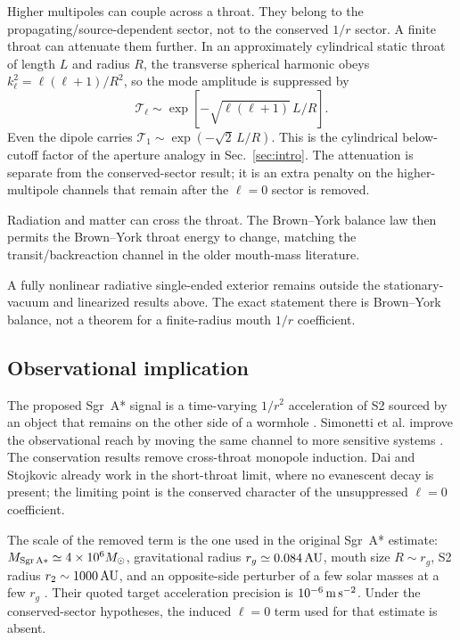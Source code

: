 \documentclass[aps,prd,10pt,onecolumn,nofootinbib,superscriptaddress,floatfix]{revtex4-2}
\begin{document}
Higher multipoles can couple across a throat.  They belong to the
propagating/source-dependent sector, not to the conserved $1/r$ sector.  A
finite throat can attenuate them further.  In an approximately cylindrical
static throat of length $L$ and radius $R$, the transverse spherical harmonic obeys
$k_\ell^2=\ell(\ell+1)/R^2$, so the mode amplitude is suppressed by
\begin{equation}
  \mathcal T_\ell \sim
  \exp\!\left[-\sqrt{\ell(\ell+1)}\,L/R\right].
\end{equation}
Even the dipole carries $\mathcal T_1\sim \exp(-\sqrt2\,L/R)$.  This
is the cylindrical below-cutoff factor of the aperture analogy in
Sec.~\ref{sec:intro}.  The attenuation is separate from the conserved-sector
result; it is an extra penalty on the higher-multipole channels that remain
after the $\ell=0$ sector is removed.

Radiation and matter can cross the throat.  The Brown--York balance law then
permits the Brown--York throat energy to change, matching the
transit/backreaction channel in the older mouth-mass literature.

A fully nonlinear radiative single-ended exterior remains outside the
stationary-vacuum and linearized results above.  The exact statement there is
Brown--York balance, not a theorem for a finite-radius mouth $1/r$
coefficient.

\subsection{Observational implication}

The proposed Sgr~A* signal is a time-varying $1/r^2$ acceleration of S2 sourced
by an object that remains on the other side of a wormhole
\cite{DaiStojkovic2019Observing}.  Simonetti et al. improve the observational
reach by moving the same channel to more sensitive systems
\cite{SimonettiEtAl2021SensitiveSearches}.  The conservation results remove
cross-throat monopole induction.  Dai and Stojkovic already work in the
short-throat limit, where no evanescent decay is present; the limiting point is
the conserved character of the unsuppressed $\ell=0$ coefficient.

The scale of the removed term is the one used in the original Sgr~A* estimate:
$M_{\rm Sgr\,A*}\simeq4\times10^6M_\odot$, gravitational radius
$r_g\simeq0.084\,{\rm AU}$, mouth size $R\sim r_g$, S2 radius
$r_2\sim1000\,{\rm AU}$, and an opposite-side perturber of a few solar masses at a few
$r_g$ \cite{DaiStojkovic2019Observing}.  Their quoted target acceleration
precision is $10^{-6}\,{\rm m\,s^{-2}}$.  Under the conserved-sector
hypotheses, the induced $\ell=0$ term used for that estimate is absent.
\end{document}
